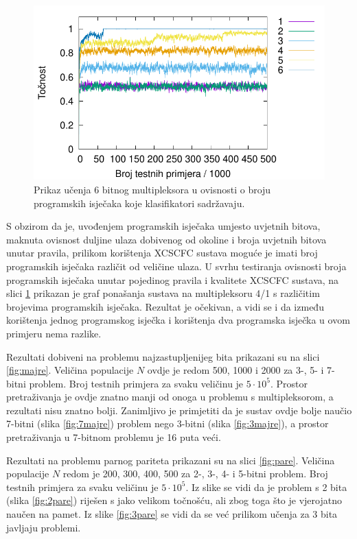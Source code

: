 \documentclass[times, utf8, zavrsni]{fer}
\begin{document}
\begin{figure}[!h]
    \centering
    \includegraphics[width=12cm]{img/mux_cond/6bitcond.pdf}
    \caption{Prikaz učenja 6 bitnog multipleksora u ovisnosti o broju programskih isječaka koje klasifikatori sadržavaju.}
    \label{img:6bitcond}
\end{figure}
S obzirom da je, uvođenjem programskih isječaka umjesto uvjetnih bitova, maknuta ovisnost duljine ulaza dobivenog od okoline i broja uvjetnih bitova unutar pravila, prilikom korištenja XCSCFC sustava moguće je imati broj programskih isječaka različit od veličine ulaza.
U svrhu testiranja ovisnosti broja programskih isječaka unutar pojedinog pravila i kvalitete XCSCFC sustava, na slici \ref{img:6bitcond} prikazan je graf ponašanja sustava na multipleksoru 4/1 s različitim brojevima programskih isječaka.
Rezultat je očekivan, a vidi se i da između korištenja jednog programskog isječka i korištenja dva programska isječka u ovom primjeru nema razlike.

Rezultati dobiveni na problemu najzastupljenijeg bita prikazani su na slici \ref{fig:majre}.
Veličina populacije $N$ ovdje je redom 500, 1000 i 2000 za 3-, 5- i 7-bitni problem.
Broj testnih primjera za svaku veličinu je $5 \cdot 10^{5}$.
Prostor pretraživanja je ovdje znatno manji od onoga u problemu s multipleksorom, a rezultati nisu znatno bolji.
Zanimljivo je primjetiti da je sustav ovdje bolje naučio 7-bitni (slika \ref{fig:7majre}) problem nego 3-bitni (slika \ref{fig:3majre}), a prostor pretraživanja u 7-bitnom problemu je 16 puta veći.

Rezultati na problemu parnog pariteta prikazani su na slici \ref{fig:pare}.
Veličina populacije $N$ redom je 200, 300, 400, 500 za 2-, 3-, 4- i 5-bitni problem.
Broj testnih primjera za svaku veličinu je $5 \cdot 10^{5}$.
Iz slike se vidi da je problem s 2 bita (slika \ref{fig:2pare}) riješen s jako velikom točnošću, ali zbog toga što je vjerojatno naučen na pamet.
Iz slike \ref{fig:3pare} se vidi da se već prilikom učenja za 3 bita javljaju problemi.
\end{document}
